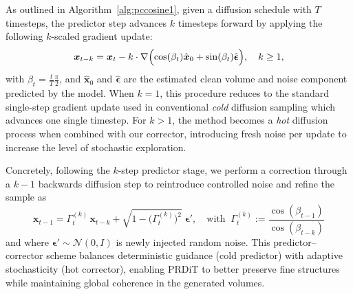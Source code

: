 As outlined in Algorithm~\ref{alg:pccosine1}, given a diffusion schedule with $T$ timesteps, the predictor step advances $k$ timesteps forward by applying the following $k$-scaled gradient update:
\begin{equation}
\label{eq5}
\boldsymbol{x}_{t-k} = \boldsymbol{x}_t - k \cdot \nabla\Bigl(\cos(\beta_t)\hat{\boldsymbol{x}}_0 + \sin(\beta_t)\hat{\boldsymbol{\epsilon}}\Bigr), \quad k \geq 1,
\end{equation}
with $\beta_t = \frac{t}{T}\frac{\pi}{2}$, and $\hat{\boldsymbol{x}}_0$ and $\hat{\boldsymbol{\epsilon}}$ are the estimated clean volume and noise component predicted by the model.  
When $k=1$, this procedure reduces to the standard single-step gradient update used in conventional \emph{cold} diffusion sampling which advances one single timestep. For $k>1$, the method becomes a \emph{hot} diffusion process when combined with our corrector, introducing fresh noise per update to increase the level of stochastic exploration. 

Concretely, following the $k$-step predictor stage, we perform a correction through a $k-1$ backwards diffusion step to reintroduce controlled noise and refine the sample as
\begin{equation}
\label{eq6}
    \boldsymbol{x}_{t-1} = \Gamma_{t}^{(k)}\,\boldsymbol{x}_{t-k} + \sqrt{1 - \bigl(\Gamma_{t}^{(k)}\bigr)^{2}}\;\boldsymbol{\epsilon}', \quad \text{with} \;\; \Gamma_{t}^{(k)} := \frac{\cos(\beta_{t-1})}{\cos(\beta_{t-k})} 
\end{equation}
and where $\boldsymbol{\epsilon}' \sim \mathcal{N}(0, I)$ is newly injected random noise.  
This predictor–corrector scheme balances deterministic guidance (cold predictor) with adaptive stochasticity (hot corrector), enabling PRDiT to better preserve fine structures while maintaining global coherence in the generated volumes.


